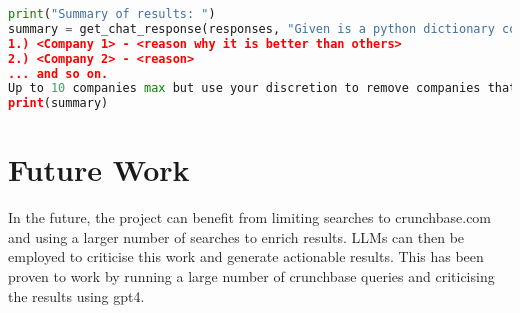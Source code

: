 \documentclass[a4paper,11pt]{article}
\begin{document}
\begin{lstlisting}[language=Python, caption=Generating Summary o fdata]
print("Summary of results: ")
summary = get_chat_response(responses, "Given is a python dictionary containing information about various startup companies. You are an experienced venture capitalist who has invested in many successful startups and know very well what distinguishes a successful, unicorn startup from its mediocre counterpart at an early stage. Examine the company details one by one and evaluate how successful you think the company can be. As a venture capitalist, you prioritise smaller companies with innovative ideas with well-educated founders that are visionaries in their field. Assign a numerical ranking to the companies according to your evaluation and return this ranked list with an up to 10 word description of why you think the company deserves this rank. Format: 
1.) <Company 1> - <reason why it is better than others> 
2.) <Company 2> - <reason> 
... and so on.
Up to 10 companies max but use your discretion to remove companies that you feel do not deserve to be on the list. The dictionary is below: ", model="gpt-4-turbo-preview")
print(summary)
\end{lstlisting}

\section{Future Work} 
In the future, the project can benefit from limiting searches to crunchbase.com and using a larger number of searches to enrich results. LLMs can then be employed to criticise this work and generate actionable results. This has been proven to work by running a large number of crunchbase queries and criticising the results using gpt4.
\end{document}
